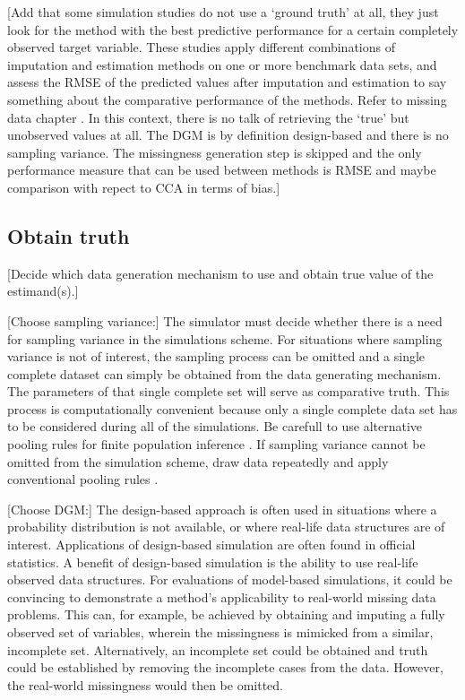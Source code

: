 \documentclass[bimj,fleqn]{w-art}
\begin{document}
[Add that some simulation studies do not use a `ground truth' at all, they just look for the method with the best predictive performance for a certain completely observed target variable. These studies apply different combinations of imputation and estimation methods on one or more benchmark data sets, and assess the RMSE of the predicted values after imputation and estimation to say something about the comparative performance of the methods. Refer to missing data chapter \citep{liu21}. In this context, there is no talk of retrieving the `true' but unobserved values at all. The DGM is by definition design-based and there is no sampling variance. The missingness generation step is skipped and the only performance measure that can be used between methods is RMSE and maybe comparison with repect to CCA in terms of bias.]



\subsection{Obtain truth}


[Decide which data generation mechanism to use and obtain true value of the estimand(s).] 

[Choose sampling variance:] The simulator must decide whether there is a need for sampling variance in the simulations scheme. For situations where sampling variance is not of interest, the sampling process can be omitted and a single complete dataset can simply be obtained from the data generating mechanism. The parameters of that single complete set will serve as comparative truth. This process is computationally convenient because only a single complete data set has to be considered during all of the simulations. Be carefull to use alternative pooling rules for finite population inference \citep{raghunathan2003multiple,vink14}. If sampling variance cannot be omitted from the simulation scheme, draw data repeatedly and apply conventional pooling rules \citep[cf.][p. 76-77]{rubi87}.

[Choose DGM:] The design-based approach is often used in situations where a probability distribution is not available, or where real-life data structures are of interest. Applications of design-based simulation are often found in official statistics. A benefit of design-based simulation is the ability to use real-life observed data structures. For evaluations of model-based simulations, it could be convincing to demonstrate a method's applicability to real-world missing data problems. This can, for example, be achieved by obtaining and imputing a fully observed set of variables, wherein the missingness is mimicked from a similar, incomplete set. Alternatively, an incomplete set could be obtained and truth could be established by removing the incomplete cases from the data. However, the real-world missingness would then be omitted.
\end{document}
